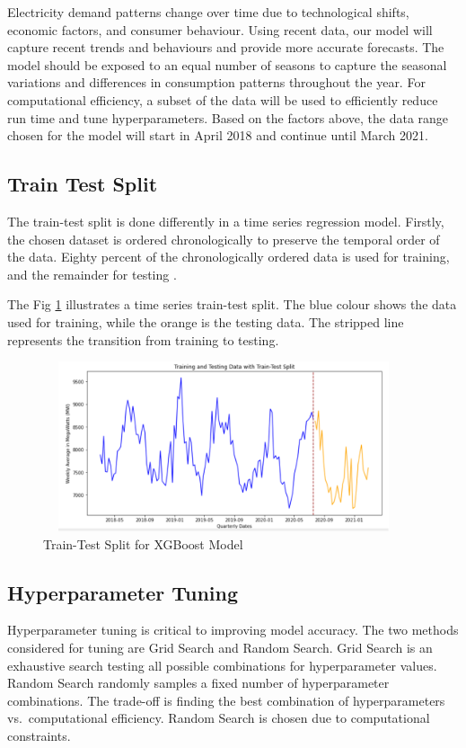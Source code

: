 \documentclass[mstat,12pt]{unswthesis}
\begin{document}
Electricity demand patterns change over time due to technological
shifts, economic factors, and consumer behaviour. Using recent data, our
model will capture recent trends and behaviours and provide more
accurate forecasts. The model should be exposed to an equal number of
seasons to capture the seasonal variations and differences in
consumption patterns throughout the year. For computational efficiency,
a subset of the data will be used to efficiently reduce run time and
tune hyperparameters. Based on the factors above, the data range chosen
for the model will start in April 2018 and continue until March 2021.

\subsection{Train Test Split}\label{train-test-split}

The train-test split is done differently in a time series regression
model. Firstly, the chosen dataset is ordered chronologically to
preserve the temporal order of the data. Eighty percent of the
chronologically ordered data is used for training, and the remainder for
testing \cite{brownlee_2020_how}.

The Fig \ref{traintest} illustrates a time series train-test split. The
blue colour shows the data used for training, while the orange is the
testing data. The stripped line represents the transition from training
to testing.

\begin{figure}[H]
\centering
\includegraphics[width=0.95\textwidth, height=5cm]{traintest.png}
\caption{Train-Test Split for XGBoost Model}\label{traintest}
\end{figure}

\subsection{Hyperparameter Tuning}\label{hyperparameter-tuning}

Hyperparameter tuning is critical to improving model accuracy. The two
methods considered for tuning are Grid Search and Random Search. Grid
Search is an exhaustive search testing all possible combinations for
hyperparameter values. Random Search randomly samples a fixed number of
hyperparameter combinations. The trade-off is finding the best
combination of hyperparameters vs.~computational efficiency. Random
Search is chosen due to computational constraints.
\end{document}
